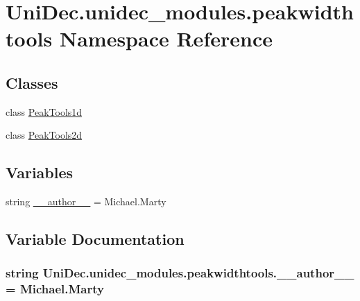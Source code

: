 \hypertarget{namespace_uni_dec_1_1unidec__modules_1_1peakwidthtools}{}\section{Uni\+Dec.\+unidec\+\_\+modules.\+peakwidthtools Namespace Reference}
\label{namespace_uni_dec_1_1unidec__modules_1_1peakwidthtools}
\subsection*{Classes}
\begin{DoxyCompactItemize}
\item 
class \hyperlink{class_uni_dec_1_1unidec__modules_1_1peakwidthtools_1_1_peak_tools1d}{Peak\+Tools1d}
\item 
class \hyperlink{class_uni_dec_1_1unidec__modules_1_1peakwidthtools_1_1_peak_tools2d}{Peak\+Tools2d}
\end{DoxyCompactItemize}
\subsection*{Variables}
\begin{DoxyCompactItemize}
\item 
string \hyperlink{namespace_uni_dec_1_1unidec__modules_1_1peakwidthtools_a8d144dcfac89b9604f853ffc30bde6d1}{\+\_\+\+\_\+author\+\_\+\+\_\+} = \textquotesingle{}Michael.\+Marty\textquotesingle{}
\end{DoxyCompactItemize}


\subsection{Variable Documentation}
\hypertarget{namespace_uni_dec_1_1unidec__modules_1_1peakwidthtools_a8d144dcfac89b9604f853ffc30bde6d1}{}
\subsubsection[{\+\_\+\+\_\+author\+\_\+\+\_\+}]{\setlength{\rightskip}{0pt plus 5cm}string Uni\+Dec.\+unidec\+\_\+modules.\+peakwidthtools.\+\_\+\+\_\+author\+\_\+\+\_\+ = \textquotesingle{}Michael.\+Marty\textquotesingle{}}\label{namespace_uni_dec_1_1unidec__modules_1_1peakwidthtools_a8d144dcfac89b9604f853ffc30bde6d1}
